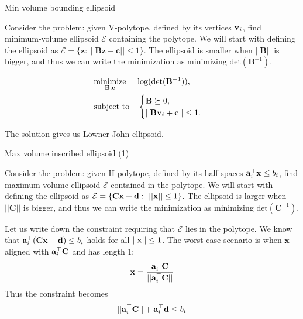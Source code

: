 \documentclass{beamer}
\begin{document}
\begin{frame}{Min volume bounding ellipsoid}
	\begin{flushleft}
		
		Consider the problem: given V-polytope, defined by its vertices $\mathbf{v}_i$, find minimum-volume ellipsoid $\mathcal{E}$ containing the polytope. We will start with defining the ellipsoid as $\mathcal{E} = \{ \mathbf{z}: \ || \mathbf{B}\mathbf{z} + \mathbf{c} || \leq 1 \}$. The ellipsoid is smaller when $|| \mathbf{B} ||$ is bigger, and thus we can write the minimization as minimizing $\text{det} (\mathbf{B}^{-1}) $.
		
\begin{equation}
	\begin{aligned}
		& \underset{\mathbf{B}, \mathbf{c}}{\text{minimize}}
		& & \text{log} (\text{det} (\mathbf{B}^{-1}) ), \\
		& \text{subject to}
		& & \begin{cases}
			\mathbf{B} \succeq 0, \\
			|| \mathbf{B} \mathbf{v}_i + \mathbf{c} || \leq 1.
		\end{cases}
	\end{aligned}
\end{equation}

The solution gives us L\"owner-John ellipsoid.
		
	\end{flushleft}
\end{frame}



\begin{frame}{Max volume inscribed ellipsoid (1)}
	\begin{flushleft}
		
		Consider the problem: given H-polytope, defined by its half-spaces $\mathbf{a}_i^\top \mathbf{x} \leq b_i$, find maximum-volume ellipsoid $\mathcal{E}$ contained in the polytope. We will start with defining the ellipsoid as $\mathcal{E} = \{ \mathbf{C}\mathbf{x} + \mathbf{d}: \ || \mathbf{x} || \leq 1 \}$. The ellipsoid is larger when $|| \mathbf{C} ||$ is bigger, and thus we can write the minimization as minimizing $\text{det} (\mathbf{C}^{-1}) $.
		
		\bigskip
		
		Let us write down the constraint requiring that $\mathcal{E}$ lies in the polytope. We know that $\mathbf{a}_i^\top (\mathbf{C}\mathbf{x} + \mathbf{d}) \leq b_i$ holds for all $|| \mathbf{x} || \leq 1$. The worst-case scenario is when $\mathbf{x}$ aligned with $\mathbf{a}_i^\top \mathbf{C}$ and has length 1:
		\begin{equation}
			\mathbf{x} = \frac{\mathbf{a}_i^\top \mathbf{C}}{|| \mathbf{a}_i^\top \mathbf{C} ||}
		\end{equation}
		Thus the constraint becomes
		\begin{equation}
			 || \mathbf{a}_i^\top \mathbf{C} || + \mathbf{a}_i^\top\mathbf{d} \leq b_i
		\end{equation}
		
	\end{flushleft}
\end{frame}
\end{document}
